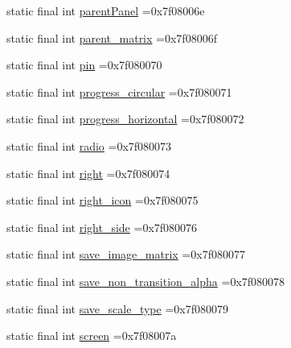 \begin{DoxyCompactItemize}
\item 
static final int \mbox{\hyperlink{classbr_1_1unb_1_1cic_1_1mp_1_1marketmaster_1_1test_1_1R_1_1id_a590a061844efdce12c0ca20228fc725b}{parent\+Panel}} =0x7f08006e
\item 
static final int \mbox{\hyperlink{classbr_1_1unb_1_1cic_1_1mp_1_1marketmaster_1_1test_1_1R_1_1id_ad49f00bd207bc23d0ee2cbaf3cdeef75}{parent\+\_\+matrix}} =0x7f08006f
\item 
static final int \mbox{\hyperlink{classbr_1_1unb_1_1cic_1_1mp_1_1marketmaster_1_1test_1_1R_1_1id_acd9d822f24a0e61ef7cf5bc29ab7827f}{pin}} =0x7f080070
\item 
static final int \mbox{\hyperlink{classbr_1_1unb_1_1cic_1_1mp_1_1marketmaster_1_1test_1_1R_1_1id_a37843a755ffdfbd6862993a19fb57842}{progress\+\_\+circular}} =0x7f080071
\item 
static final int \mbox{\hyperlink{classbr_1_1unb_1_1cic_1_1mp_1_1marketmaster_1_1test_1_1R_1_1id_a6e69795c0b0204d499f900b1e2c3c449}{progress\+\_\+horizontal}} =0x7f080072
\item 
static final int \mbox{\hyperlink{classbr_1_1unb_1_1cic_1_1mp_1_1marketmaster_1_1test_1_1R_1_1id_aabc77f060a4beea958b0319cab9af068}{radio}} =0x7f080073
\item 
static final int \mbox{\hyperlink{classbr_1_1unb_1_1cic_1_1mp_1_1marketmaster_1_1test_1_1R_1_1id_ab768c78a8c4f791bbdbd25772d9812fe}{right}} =0x7f080074
\item 
static final int \mbox{\hyperlink{classbr_1_1unb_1_1cic_1_1mp_1_1marketmaster_1_1test_1_1R_1_1id_aba5473e6655b58af58b0edc1cf8dfa03}{right\+\_\+icon}} =0x7f080075
\item 
static final int \mbox{\hyperlink{classbr_1_1unb_1_1cic_1_1mp_1_1marketmaster_1_1test_1_1R_1_1id_a3588879b7e7b4475c65554301b1338b3}{right\+\_\+side}} =0x7f080076
\item 
static final int \mbox{\hyperlink{classbr_1_1unb_1_1cic_1_1mp_1_1marketmaster_1_1test_1_1R_1_1id_acd11c6ffdbcaa82865a64952894649a4}{save\+\_\+image\+\_\+matrix}} =0x7f080077
\item 
static final int \mbox{\hyperlink{classbr_1_1unb_1_1cic_1_1mp_1_1marketmaster_1_1test_1_1R_1_1id_aa64ade8d9afc4eccbe2b0edf2d088fad}{save\+\_\+non\+\_\+transition\+\_\+alpha}} =0x7f080078
\item 
static final int \mbox{\hyperlink{classbr_1_1unb_1_1cic_1_1mp_1_1marketmaster_1_1test_1_1R_1_1id_ad9d9cf7ea4b03102cb8757f33e639b44}{save\+\_\+scale\+\_\+type}} =0x7f080079
\item 
static final int \mbox{\hyperlink{classbr_1_1unb_1_1cic_1_1mp_1_1marketmaster_1_1test_1_1R_1_1id_a9914ba2979f3a30df87e913d8111ef04}{screen}} =0x7f08007a

\end{DoxyCompactItemize}
